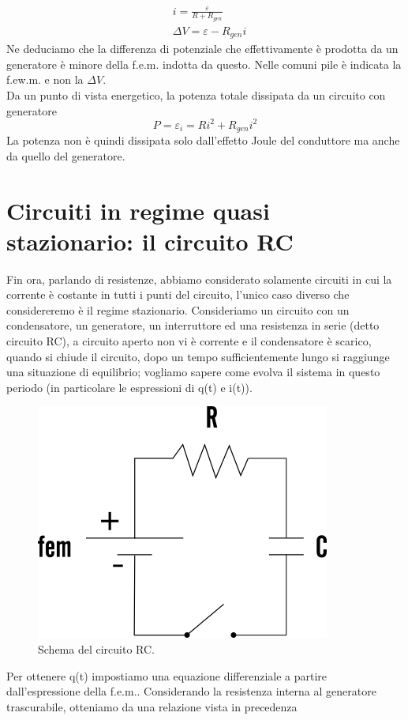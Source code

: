 \documentclass[10pt,a4paper]{article}
\begin{document}
\begin{align*}
	&i = \frac{\varepsilon}{R+R_{gen}}\\
	&\Delta V = \varepsilon-R_{gen}i
\end{align*}
Ne deduciamo che la differenza di potenziale che effettivamente è prodotta da un generatore è minore della f.e.m. indotta da questo. Nelle comuni pile è indicata la f.ew.m. e non la $\Delta V$.\\
Da un punto di vista energetico, la potenza totale dissipata da un circuito con generatore
\[P = \varepsilon_i = R i^2 + R_{gen}i^2\]
La potenza non è quindi dissipata solo dall'effetto Joule del conduttore ma anche da quello del generatore. 
\section{Circuiti in regime quasi stazionario: il circuito RC}
Fin ora, parlando di resistenze, abbiamo considerato solamente circuiti in cui la corrente è costante in tutti i punti del circuito, l'unico caso diverso che considereremo è il regime stazionario. Consideriamo un circuito con un condensatore, un generatore, un interruttore ed una resistenza in serie (detto circuito RC), a circuito aperto non vi è corrente e il condensatore è scarico, quando si chiude il circuito, dopo un tempo sufficientemente lungo si raggiunge una situazione di equilibrio; vogliamo sapere come evolva il sistema in questo periodo (in particolare le espressioni di q(t) e i(t)). 
\begin{figure}[h!]
	\centering
	\includegraphics[width=0.6\linewidth]{images/circuito-rc}
	\caption{Schema del circuito RC.}
	\label{fig:circuito-rc}
\end{figure}
\FloatBarrier
Per ottenere q(t) impostiamo una equazione differenziale a partire dall'espressione della f.e.m.. Considerando la resistenza interna al generatore trascurabile, otteniamo da una relazione vista in precedenza 
\end{document}
